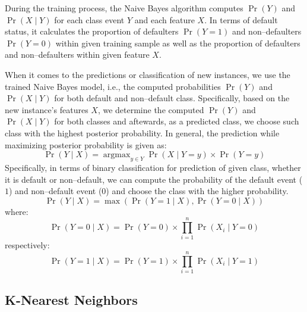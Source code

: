 During the training process, the Naive Bayes algorithm computes $\operatorname{Pr}\left(Y\right)$ and $ \operatorname{Pr}\left(X \mid Y \right)$ for each class event $Y$ and each feature $X$.
In terms of default status, it calculates the proportion of defaulters  $\operatorname{Pr}\left(Y = 1\right)$ and non--defaulters $\operatorname{Pr}\left(Y=0\right)$ within given training sample as well as the proportion of defaulters and non--defaulters within given feature $X$.


When it comes to the predictions or classification of new instances, we use the trained Naive Bayes model, i.e., the computed probabilities $\operatorname{Pr}\left(Y\right)$ and $ \operatorname{Pr}\left(X \mid Y \right)$ for both default and non--default class.
Specifically, based on the new instance's features $X$, we determine the computed $\operatorname{Pr}\left(Y\right)$ and $ \operatorname{Pr}\left(X \mid Y \right)$ for both classes and aftewards, as a predicted class, we choose such class with the highest posterior probability. In general, the prediction while maximizing posterior probability is given as:
\begin{equation}\label{eq:nb-corrected}
    \operatorname{Pr}\left(Y \mid X \right) = \operatorname{argmax}_{y \in Y} \operatorname{Pr}\left(X \mid Y = y\right) \times \operatorname{Pr}(Y = y)
\end{equation}
Specifically, in terms of binary classification for prediction of given class, whether it is default or non--default, we can compute the probability of the default event ($1$) and non--default event ($0$) and choose the class with the higher probability.
\begin{equation}\label{eq}
    \operatorname{Pr}\left(Y \mid X \right)  = \max \left(\operatorname{Pr}\left(Y=1 \mid X\right), \operatorname{Pr}\left(Y=0 \mid X\right)\right)
\end{equation}
where:
\begin{equation}
    \operatorname{Pr}\left(Y=0 \mid X \right) = \operatorname{Pr}\left(Y=0\right) \times \prod_{i=1}^{n} \operatorname{Pr}\left(X_i \mid Y=0\right)
\end{equation}
respectively:
\begin{equation}
    \operatorname{Pr}\left(Y=1 \mid X \right) = \operatorname{Pr}\left(Y=1\right) \times \prod_{i=1}^{n} \operatorname{Pr}\left(X_i \mid Y=1\right)
\end{equation}
\subsection{K-Nearest Neighbors}
\label{subsec:knn-theory}

